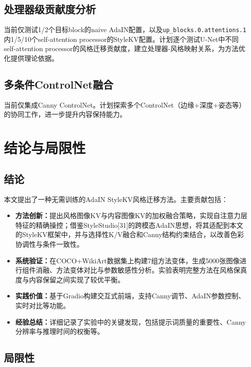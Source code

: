 \documentclass[10pt,twocolumn]{article}
\begin{document}
\subsection{处理器级贡献度分析}
当前仅测试1/2个目标block的naive AdaIN配置，以及\texttt{up\_blocks.0.attentions.1}内1/5/10个self-attention processor的StyleKV配置。计划逐个测试U-Net中不同self-attention processor的风格迁移贡献度，建立处理器-风格映射关系，为方法优化提供理论依据。

\subsection{多条件ControlNet融合}
当前仅集成Canny ControlNet。计划探索多个ControlNet（边缘+深度+姿态等）的协同工作，进一步提升内容保持能力。

\FloatBarrier
\section{结论与局限性}

\subsection{结论}

本文提出了一种无需训练的AdaIN StyleKV风格迁移方法。主要贡献包括：

\begin{itemize}
  \setlength{\itemsep}{0pt}
\item {\bfseries 方法创新：}提出风格图像KV与内容图像KV的加权融合策略，实现自注意力层特征的精确操控；借鉴StyleStudio[31]的跨模态AdaIN思想，将其适配到本文的StyleKV框架中，并与选择性K/V融合和Canny结构约束结合，以改善色彩协调性与条件一致性。
\item {\bfseries 系统验证：}在COCO+WikiArt数据集上构建7组方法变体，生成5000张图像进行组件消融、方法变体对比与参数敏感性分析。实验表明完整方法在风格保真度与内容保留之间实现了较优平衡。
\item {\bfseries 实践价值：}基于Gradio构建交互式前端，支持Canny调节、AdaIN参数控制、实时对比等功能。
\item {\bfseries 经验总结：}详细记录了实验中的关键发现，包括提示词质量的重要性、Canny分辨率与推理时间的权衡等。
\end{itemize}

\subsection{局限性}
\end{document}
